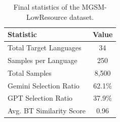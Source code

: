 \begin{table}[h]
\centering
\small
\begin{tabular}{lc}
\toprule
\textbf{Statistic} & \textbf{Value} \\
\midrule
Total Target Languages & 34 \\
Samples per Language & 250 \\
Total Samples & 8,500 \\
Gemini Selection Ratio & 62.1\% \\
GPT Selection Ratio & 37.9\% \\
Avg. BT Similarity Score & 0.96 \\
\bottomrule
\end{tabular}
\caption{Final statistics of the MGSM-LowResource dataset.}
\label{tab:final-stats}
\end{table}